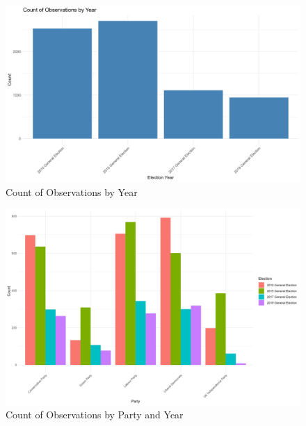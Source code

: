 \documentclass[preprint]{elsarticle} %
\begin{document}
\begin{figure}[htbp]  %
	\centering
	\includegraphics[width=\textwidth, height=0.7\textheight, keepaspectratio]{count_by_year.png} %
	\caption{Count of Observations by Year}
	\label{fig:count_by_year}
\end{figure}




\begin{figure}[htbp]
	\centering
	\includegraphics[width=\textwidth, height=0.6\textheight, keepaspectratio]{count_by_party_year.png} %
	\caption{Count of Observations by Party and Year}
	\label{fig:count_by_party_year}
\end{figure}
\end{document}
